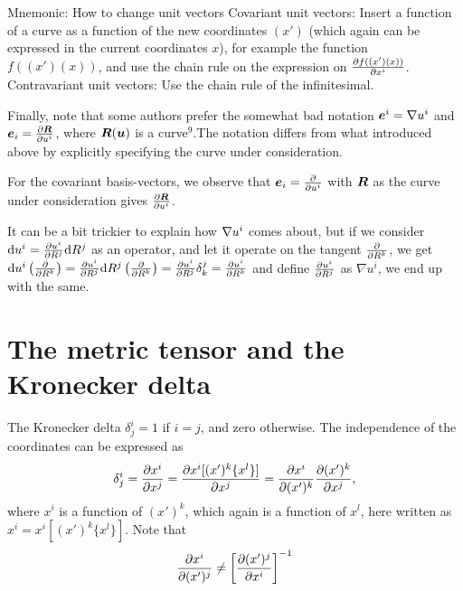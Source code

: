 \documentclass[a4paper, 12pt]{article}
\begin{document}
\vspace{0.5cm}
\begin{greenbox}{Mnemonic: How to change unit vectors}
 Covariant unit vectors: Insert a function of a curve as a function of the new
 coordinates $(x')$ (which again can be expressed in the current coordinates
 $x$), for example the function $f((x')(x))$, and use the chain rule on the
 expression on $\frac{\partial {f((x')(x))}}{\partial{x^i}}$.\\
 Contravariant unit vectors: Use the chain rule of the infinitesimal.
\end{greenbox}
%
Finally, note that some authors prefer the somewhat bad notation $\boldsymbol{e}^i =
\nabla u^i$ and $\boldsymbol{e}_i = \frac{\partial {\boldsymbol{R}}}{\partial{u^i}}$, where $\boldsymbol{R}(\boldsymbol{u})$ is a
curve\hyperref[note:curve]{$^9$}.The notation differs from what introduced
above by explicitly specifying the curve under consideration.

For the covariant basis-vectors, we observe that $\boldsymbol{e}_i = \frac{\partial {}}{\partial{u^i}}$
with $\boldsymbol{R}$ as the curve under consideration gives $\frac{\partial {\boldsymbol{R}}}{\partial{u^i}}$.

It can be a bit trickier to explain how $\nabla u^i$ comes about, but if we
consider $\text{d} u^i = \frac{\partial {u^i}}{\partial{R^j}} \text{d} R^j$ as an operator, and let it operate
on the tangent $\frac{\partial {}}{\partial{R^k}}$, we get $\text{d} u^i\left(\frac{\partial {}}{\partial{R^k}}\right) =
\frac{\partial {u^i}}{\partial{R^j}} \text{d} R^j\left(\frac{\partial {}}{\partial{R^k}}\right) = \frac{\partial {u^i}}{\partial{R^j}} \delta^j_k =
\frac{\partial {u^i}}{\partial{R^k}}$ and define $\frac{\partial {u^i}}{\partial{R^j}}$ as $\nabla u^i$, we end up with
the same.





\section{The metric tensor and the Kronecker delta}\label{sec:metrics}
The Kronecker delta $\delta^i_j = 1$ if $i=j$, and zero otherwise. The
independence of the coordinates can be expressed as
%
\begin{align*}
 \delta^i_j = \frac{\partial {x^i}}{\partial{x^j}} = \frac{\partial {x^i[(x')^k\{x^l\}]}}{\partial{x^j}} =
 \frac{\partial {x^i}}{\partial{(x')^k}}\frac{\partial {(x')^k}}{\partial{x^j}},
\end{align*}
%
where $x^i$ is a function of $(x')^k$, which again is a function of $x^l$, here
written as $x^i = x^i[(x')^k\{x^l\}]$. Note that
%
\begin{align*}
 \frac{\partial {x^i}}{\partial{(x')^j}} \neq \left[\frac{\partial {(x')^j}}{\partial{x^i}}\right]^{-1}
\end{align*}
\end{document}
